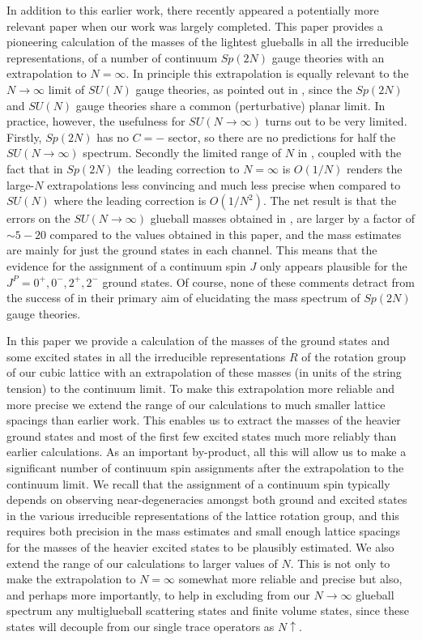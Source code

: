 \documentclass[12pt]{article}
\begin{document}
In addition to this earlier work, there recently appeared a potentially more relevant paper 
%
\cite{SpN_Lucini} 
%
when our work was largely completed.
This paper provides a pioneering calculation of the masses of the 
lightest glueballs in all the irreducible representations, of a number of continuum 
$Sp(2N)$ gauge theories with an extrapolation to $N=\infty$. In principle this extrapolation 
is equally relevant to the $N\to\infty$ limit of $SU(N)$ gauge theories, as pointed out in
%
\cite{SpN_Lucini},
%
since the  $Sp(2N)$ and $SU(N)$ gauge theories share a common (perturbative) planar limit.
In practice, however, the usefulness for $SU(N\to\infty)$ turns out to be very limited. Firstly, 
$Sp(2N)$ has no $C=-$ sector, so there are no predictions for half the $SU(N\to\infty)$
spectrum. Secondly the limited range of $N$ in
%
\cite{SpN_Lucini},
%
coupled with the fact that in $Sp(2N)$ the leading
correction to $N=\infty$ is $O(1/N)$ renders the large-$N$ extrapolations less convincing 
and much less precise when compared to  $SU(N)$ where the leading correction is $O(1/N^2)$.
The net result is that the errors on the $SU(N\to\infty)$ glueball masses obtained in 
%
\cite{SpN_Lucini},
%
are larger by 
a factor of $\sim 5 - 20$ compared to the values obtained in this paper, and the mass
estimates are mainly for just the ground states in each channel. This means that
the evidence for the assignment of a continuum spin $J$ only appears plausible for
the $J^P=0^+,0^-,2^+,2^-$ ground states. Of course, none of these comments detract
from the success of
%
\cite{SpN_Lucini} 
%
in their primary aim of elucidating the mass spectrum of $Sp(2N)$  gauge theories.

In this paper we provide a calculation of the masses of the ground states and some excited
states in all the irreducible representations $R$ of the rotation group of our cubic lattice 
with an extrapolation of these masses (in units of the string tension) to the continuum limit.
To make this extrapolation  more reliable and more precise we extend the range of
our calculations to much smaller lattice spacings than earlier work. This enables
us to extract the masses of the heavier ground states and most of the first few
excited states much more reliably than earlier calculations.
As an important by-product, all this will allow us to make a significant number 
of continuum spin assignments after the extrapolation to the continuum limit. 
We recall that the assignment of a continuum spin typically depends on observing 
near-degeneracies amongst both ground and excited states in the various irreducible 
representations of the lattice rotation group, and this requires both precision 
in the mass estimates and small enough lattice spacings for the masses of the
heavier excited states to be plausibly estimated. We also extend the range 
of our calculations to larger values of $N$. This is not only to make the 
extrapolation to $N=\infty$ somewhat more reliable and precise but also, and perhaps 
more importantly, to help in excluding from our $N\to\infty$ glueball spectrum any 
multiglueball scattering states and  finite volume states, since these states 
will decouple from our single trace operators as $N\uparrow$.
\end{document}
